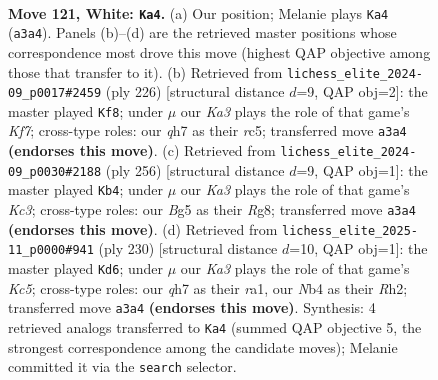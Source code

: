 \documentclass[11pt]{article}
\begin{document}
\clearpage

\begin{figure}[p]\centering
\begin{subfigure}{0.46\textwidth}\centering
\resizebox{\linewidth}{!}{%
\newchessgame
\chessboard[
  setfen={8/2k4q/8/6B1/1N6/K7/8/8 w - - 10 121},
  showmover=false,
  pgfstyle=straightmove, color=movearrow, markmove={a3-a4}
]}
\caption{}
\end{subfigure}\hfill
\begin{subfigure}{0.46\textwidth}\centering
\resizebox{\linewidth}{!}{%
\newchessgame
\chessboard[
  setfen={6N1/5K2/8/2r2k2/8/8/8/8 w - - 76 114},
  showmover=false,
  pgfstyle=straightmove, color=movearrow, markmove={f7-f8}
]}
\caption{}
\end{subfigure}
\\[4pt]
\begin{subfigure}{0.46\textwidth}\centering
\resizebox{\linewidth}{!}{%
\newchessgame
\chessboard[
  setfen={6R1/3q4/8/3k4/8/2K5/8/8 w - - 16 129},
  showmover=false,
  pgfstyle=straightmove, color=movearrow, markmove={c3-b4}
]}
\caption{}
\end{subfigure}\hfill
\begin{subfigure}{0.46\textwidth}\centering
\resizebox{\linewidth}{!}{%
\newchessgame
\chessboard[
  setfen={8/8/8/2KN4/8/8/7R/r1k5 w - - 73 116},
  showmover=false,
  pgfstyle=straightmove, color=movearrow, markmove={c5-d6}
]}
\caption{}
\end{subfigure}
\caption{\textbf{Move 121, White: \texttt{Ka4}.} (a) Our position; Melanie plays \texttt{Ka4} (\texttt{a3a4}). Panels (b)--(d) are the retrieved master positions whose correspondence most drove this move (highest QAP objective among those that transfer to it). (b) Retrieved from \texttt{lichess\_elite\_2024-09\_p0017\#2459} (ply 226) [structural distance $d$=9, QAP obj=2]: the master played \texttt{Kf8}; under $\mu$ our \emph{Ka3} plays the role of that game's \emph{Kf7}; cross-type roles: our \emph{q}h7 as their \emph{r}c5; transferred move \texttt{a3a4} \textbf{(endorses this move)}. (c) Retrieved from \texttt{lichess\_elite\_2024-09\_p0030\#2188} (ply 256) [structural distance $d$=9, QAP obj=1]: the master played \texttt{Kb4}; under $\mu$ our \emph{Ka3} plays the role of that game's \emph{Kc3}; cross-type roles: our \emph{B}g5 as their \emph{R}g8; transferred move \texttt{a3a4} \textbf{(endorses this move)}. (d) Retrieved from \texttt{lichess\_elite\_2025-11\_p0000\#941} (ply 230) [structural distance $d$=10, QAP obj=1]: the master played \texttt{Kd6}; under $\mu$ our \emph{Ka3} plays the role of that game's \emph{Kc5}; cross-type roles: our \emph{q}h7 as their \emph{r}a1, our \emph{N}b4 as their \emph{R}h2; transferred move \texttt{a3a4} \textbf{(endorses this move)}. Synthesis: 4 retrieved analogs transferred to \texttt{Ka4} (summed QAP objective 5, the strongest correspondence among the candidate moves); Melanie committed it via the \texttt{search} selector.}
\label{fig:thought-m240}
\end{figure}
\end{document}
